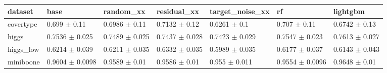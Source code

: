 \begin{tabular}{lllllll}
\toprule
dataset & base & random\_xx & residual\_xx & target\_noise\_xx & rf & lightgbm \\
\midrule
covertype & 0.699 $\pm$ 0.11 & 0.6986 $\pm$ 0.11 & 0.7132 $\pm$ 0.12 & 0.6261 $\pm$ 0.1 & 0.707 $\pm$ 0.11 & 0.6742 $\pm$ 0.13 \\
higgs & 0.7536 $\pm$ 0.025 & 0.7489 $\pm$ 0.025 & 0.7437 $\pm$ 0.028 & 0.7423 $\pm$ 0.029 & 0.7547 $\pm$ 0.023 & 0.7613 $\pm$ 0.027 \\
higgs\_low & 0.6214 $\pm$ 0.039 & 0.6211 $\pm$ 0.035 & 0.6332 $\pm$ 0.035 & 0.5989 $\pm$ 0.035 & 0.6177 $\pm$ 0.037 & 0.6143 $\pm$ 0.043 \\
miniboone & 0.9604 $\pm$ 0.0098 & 0.9589 $\pm$ 0.01 & 0.9586 $\pm$ 0.01 & 0.955 $\pm$ 0.011 & 0.9554 $\pm$ 0.0096 & 0.9648 $\pm$ 0.01 \\
\bottomrule
\end{tabular}
